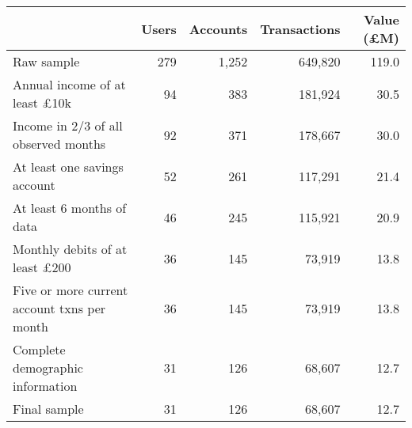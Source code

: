\begin{tabular}{lrrrr}
\toprule
                                            & Users & Accounts & Transactions & Value (\pounds M) \\
\midrule
                                 Raw sample &   279 &    1,252 &      649,820 &             119.0 \\
       Annual income of at least \pounds10k &    94 &      383 &      181,924 &              30.5 \\
       Income in 2/3 of all observed months &    92 &      371 &      178,667 &              30.0 \\
               At least one savings account &    52 &      261 &      117,291 &              21.4 \\
                  At least 6 months of data &    46 &      245 &      115,921 &              20.9 \\
      Monthly debits of at least \pounds200 &    36 &      145 &       73,919 &              13.8 \\
Five or more current account txns per month &    36 &      145 &       73,919 &              13.8 \\
           Complete demographic information &    31 &      126 &       68,607 &              12.7 \\
                               Final sample &    31 &      126 &       68,607 &              12.7 \\
\bottomrule
\end{tabular}
